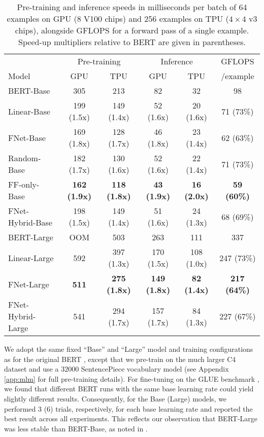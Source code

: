 \documentclass[11pt]{article}
\begin{document}
\begin{table*}[tb]
    \caption{Pre-training and inference speeds in milliseconds per batch of 64 examples on GPU ($8$ V100 chips) and 256 examples on TPU ($4\times4$ v3 chips), alongside GFLOPS for a forward pass of a single example. Speed-up multipliers relative to BERT are given in parentheses.}
    \label{tab:pretrain_speed}
    \centering
    \begin{tabular}{l | c c | c c | c}
        \hline
         & \multicolumn{2}{c|}{Pre-training} & \multicolumn{2}{c|}{Inference} & GFLOPS  \\  
         Model & GPU & TPU & GPU & TPU & /example \\ \hline \hline
         BERT-Base & 305 & 213 & 82  & 32 & 98 \\
         Linear-Base & 199 (1.5x) & 149 (1.4x) & 52 (1.6x)  & 20 (1.6x) & 71 (73\%) \\
         FNet-Base & 169 (1.8x) & 128 (1.7x) & 46 (1.8x) & 23 (1.4x) & 62 (63\%) \\
         Random-Base & 182 (1.7x) & 130 (1.6x) & 52 (1.6x) & 22 (1.4x) & 71 (73\%) \\
         FF-only-Base & \textbf{162 (1.9x)} & \textbf{118 (1.8x)} & \textbf{43 (1.9x)} & \textbf{16 (2.0x)} & \textbf{59 (60\%)} \\
         FNet-Hybrid-Base & 198 (1.5x) & 149 (1.4x) & 51 (1.6x) & 24 (1.3x) & 68 (69\%) \\ \hline
         BERT-Large & OOM & 503 & 263 & 111 & 337 \\
         Linear-Large & 592 & 397 (1.3x) & 170 (1.5x) & 108 (1.0x) & 247 (73\%) \\
         FNet-Large & \textbf{511} & \textbf{275 (1.8x)} & \textbf{149 (1.8x)} & \textbf{82 (1.4x)} & \textbf{217 (64\%)} \\ 
         FNet-Hybrid-Large & 541 & 294 (1.7x) & 157 (1.7x) & 84 (1.3x) & 227 (67\%)\\ \hline
    \end{tabular}
\end{table*}

We adopt the same fixed ``Base'' and ``Large'' model and training configurations as for the original BERT \citep{devlin2018bert}, except that we pre-train on the much larger C4 dataset \citep{raffel2019exploring} and use a $32000$ SentencePiece vocabulary model \citep{kudo2018sentencepiece} (see Appendix \ref{app:mlm} for full pre-training details). For fine-tuning on the GLUE benchmark \citep{wang2018glue}, we found that different BERT runs with the same base learning rate could yield slightly different results. Consequently, for the Base (Large) models, we performed 3 (6) trials, respectively, for each base learning rate and reported the best result across all experiments. This reflects our observation that BERT-Large was less stable than BERT-Base, as noted in \citet{devlin2018bert}.
\end{document}
